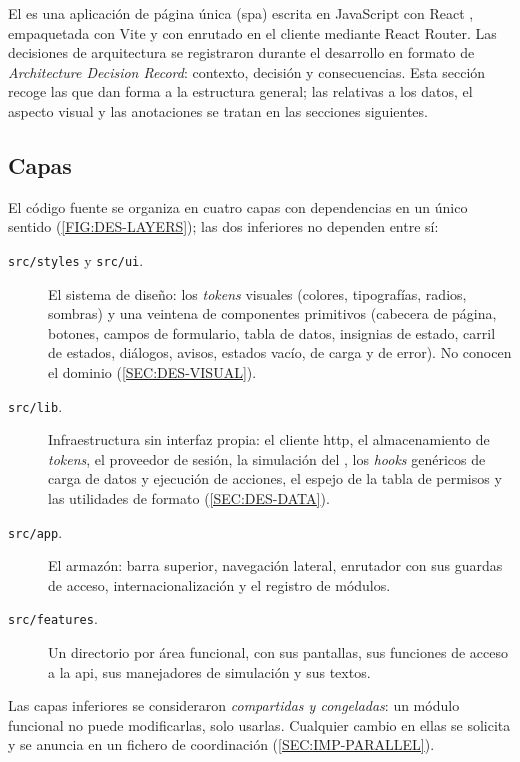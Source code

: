 El  es una aplicación de página única (\acs{spa}) escrita en JavaScript con
React \cite{react_docs}, empaquetada con Vite \cite{vite_docs} y con enrutado en el
cliente mediante React Router. Las decisiones de arquitectura se registraron durante el
desarrollo en formato de \textit{Architecture Decision Record}: contexto, decisión y
consecuencias. Esta sección recoge las que dan forma a la estructura general; las relativas
a los datos, el aspecto visual y las anotaciones se tratan en las secciones siguientes.

\subsection{Capas}

El código fuente se organiza en cuatro capas con dependencias en un único sentido
(\cref{FIG:DES-LAYERS}); las dos inferiores no dependen entre sí:
\begin{description}
  \item[\texttt{src/styles} y \texttt{src/ui}.] El sistema de diseño: los
        \textit{tokens} visuales (colores, tipografías, radios, sombras) y una veintena de
        componentes primitivos (cabecera de página, botones, campos de formulario, tabla
        de datos, insignias de estado, carril de estados, diálogos, avisos, estados vacío,
        de carga y de error). No conocen el dominio (\cref{SEC:DES-VISUAL}).
  \item[\texttt{src/lib}.] Infraestructura sin interfaz propia: el cliente \acs{http}, el
        almacenamiento de \textit{tokens}, el proveedor de sesión, la simulación del
        , los \textit{hooks} genéricos de carga de datos y ejecución de
        acciones, el espejo de la tabla de permisos y las utilidades de formato
        (\cref{SEC:DES-DATA}).
  \item[\texttt{src/app}.] El armazón: barra superior, navegación lateral, enrutador con
        sus guardas de acceso, internacionalización y el registro de módulos.
  \item[\texttt{src/features}.] Un directorio por área funcional, con sus pantallas, sus
        funciones de acceso a la \acs{api}, sus manejadores de simulación y sus textos.
\end{description}
Las capas inferiores se consideraron \emph{compartidas y congeladas}: un módulo funcional
no puede modificarlas, solo usarlas. Cualquier cambio en ellas se solicita y se anuncia en
un fichero de coordinación (\cref{SEC:IMP-PARALLEL}).

